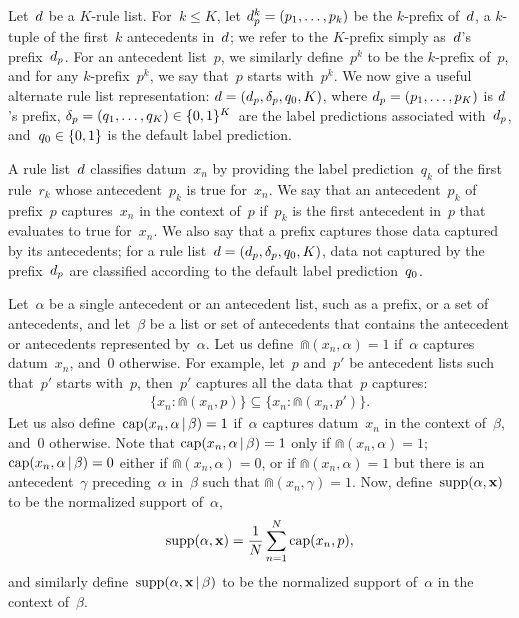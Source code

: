 Let~${d}$ be a $K$-rule list.
%
For~$k \le K$, let ${{d}_p^k = (p_1, \dots, p_k)}$ be the $k$-prefix of~${d}$,
a $k$-tuple of the first~$k$ antecedents in~${d}$;
we refer to the $K$-prefix simply as~${d}$'s prefix~$d_p$.
%
For an antecedent list~$p$, we similarly define~$p^k$ to be the $k$-prefix of~$p$,
and for any $k$-prefix~$p^k$, we say that~$p$ starts with~$p^k$.
%
We now give a useful alternate rule list representation:
${{d} = (d_p, \delta_p, q_0, K)}$,
where ${d_p = (p_1, \dots, p_K)}$ is ${d}$'s prefix,
${\delta_p = (q_1, \dots, q_K) \in \{0, 1\}^K}$~are the label predictions associated
with~$d_p$, and~${q_0 \in \{0, 1\}}$ is the default label prediction.

A rule list~${d}$ classifies datum~$x_n$ by providing the label prediction~$q_k$
of the first rule~$r_k$ whose antecedent~$p_k$ is true for~$x_n$.
%
We say that an antecedent~$p_k$ of prefix~$p$ captures~$x_n$ in the context of~$p$
if~$p_k$ is the first antecedent in~$p$ that evaluates to true for~$x_n$.
%
We also say that a prefix captures those data captured by its antecedents;
for a rule list~${{d} = (d_p, \delta_p, q_0, K)}$,
data not captured by the prefix~$d_p$
are classified according to the default label prediction~$q_0$.

Let~$\alpha$ be a single antecedent or an antecedent list,
such as a prefix, or a set of antecedents,
and let~$\beta$ be a list or set of antecedents
that contains the antecedent or antecedents represented by~$\alpha$.
%
Let us define~${\Cap(x_n, \alpha) = 1}$ if~$\alpha$ captures datum~$x_n$,
and~0 otherwise.
%
For example, let~$p$ and~$p'$ be antecedent lists such that~$p'$
starts with~$p$, then~$p'$ captures all the data that~$p$ captures:
\begin{align}
\{x_n: \Cap(x_n, p)\} \subseteq \{x_n: \Cap(x_n, p')\}.
\label{eq:cap-subset}
\end{align}
%
Let us also define~${\text{cap}(x_n, \alpha \,|\, \beta) = 1}$ if~$\alpha$
captures datum~$x_n$ in the context of~$\beta$, and~$0$ otherwise.
%
Note that ${\text{cap}(x_n, \alpha \,|\, \beta) = 1}$ only if ${\Cap(x_n, \alpha) = 1}$;
${\text{cap}(x_n, \alpha \,|\, \beta) = 0}$ either if ${\Cap(x_n, \alpha) = 0}$,
or if ${\Cap(x_n, \alpha) = 1}$ but there is an antecedent~$\gamma$
preceding~$\alpha$ in~$\beta$ such that ${\Cap(x_n, \gamma) = 1}$.
%
Now, define~${\text{supp}(\alpha, \mathbf{x})}$ to be the normalized support of~$\alpha$,
\begin{align}
\Supp(\alpha, \x) = \frac{1}{N} \sum_{n=1}^N \Cap(x_n, p),
\end{align}
and similarly define~${\text{supp}(\alpha, \mathbf{x} \,|\, \beta)}$
to be the normalized support of~$\alpha$ in the context of~$\beta$.

